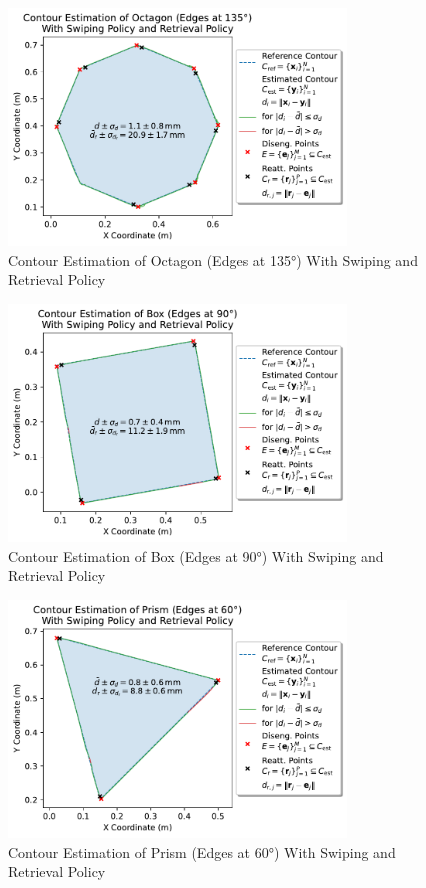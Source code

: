 \begin{figure}[htb]
    \centering
    \includegraphics[width=0.8\textwidth]{figures/experiments/octagon-edges-135deg-swiping-retrieval}
    \caption{Contour Estimation of Octagon (Edges at 135°) With Swiping and Retrieval Policy}
    \label{fig:experiment-octagon-edges-135deg-swiping-retrieval}
\end{figure}
\begin{figure}[htb]
    \centering
    \includegraphics[width=0.8\textwidth]{figures/experiments/box-edges-90deg-swiping-retrieval}
    \caption{Contour Estimation of Box (Edges at 90°) With Swiping and Retrieval Policy}
    \label{fig:experiment-box-edges-90deg-swiping-retrieval}
\end{figure}
\begin{figure}[htb]
    \centering
    \includegraphics[width=0.8\textwidth]{figures/experiments/prism-edges-60deg-swiping-retrieval}
    \caption{Contour Estimation of Prism (Edges at 60°) With Swiping and Retrieval Policy}
    \label{fig:experiment-prism-edges-60deg-swiping-retrieval}
\end{figure}
